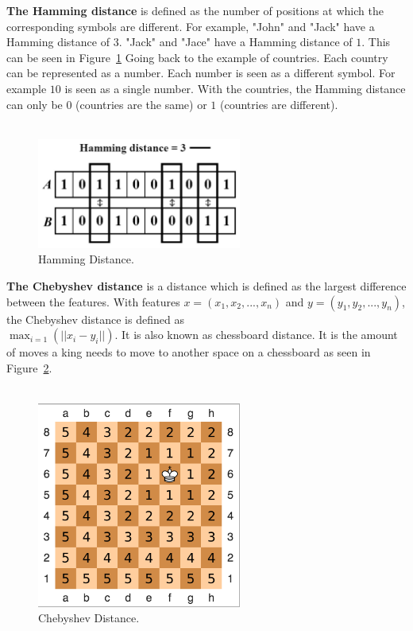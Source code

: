\noindent \textbf{The Hamming distance} is defined as the number of positions at which the corresponding symbols are different.\cite{hammingDistance} For example, "John" and "Jack" have a Hamming distance of $3$. "Jack" and "Jace" have a Hamming distance of $1$. This can be seen in Figure~\ref{fig:hammingDistance} Going back to the example of countries. Each country can be represented as a number. Each number is seen as a different symbol. For example $10$ is seen as a single number. With the countries, the Hamming distance can only be $0$ (countries are the same) or $1$ (countries are different). \\\\

\begin{figure}[H]
\centering
\includegraphics[width=0.6\textwidth]{Figures/hammingDistance}
\decoRule
\caption[Hamming Distance]{Hamming Distance. \cite{hammingDistance}}
\label{fig:hammingDistance}
\end{figure}

\noindent \textbf{The Chebyshev distance} is a distance which is defined as the largest difference between the features. With features $x = (x_1, x_2,..., x_n)$ and $y = (y_1, y_2,..., y_n)$, the Chebyshev distance is defined as \\ $\max_{i=1}(||x_i-y_i||)$. It is also known as chessboard distance. \cite{chebyshevDistanceExplain} It is the amount of moves a king needs to move to another space on a chessboard as seen in Figure~\ref{fig:chebyshevDistance}.  \\\\

\begin{figure}[H]
\centering
\includegraphics[width=0.6\textwidth]{Figures/chebyshevDistance}
\decoRule
\caption[Chebyshev Distance]{Chebyshev Distance. \cite{chebyshevDistance}}
\label{fig:chebyshevDistance}
\end{figure}

